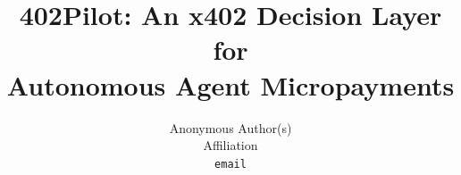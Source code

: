 \documentclass{article}
\title{402Pilot: An x402 Decision Layer for\\Autonomous Agent Micropayments}
\author{%
  Anonymous Author(s)\\
  Affiliation\\
  \texttt{email}
}
\theoremstyle{remark}
\begin{document}
\maketitle

\begin{abstract}

\end{abstract}










\begin{ack}
\end{ack}




\appendix





\newpage

\end{document}
